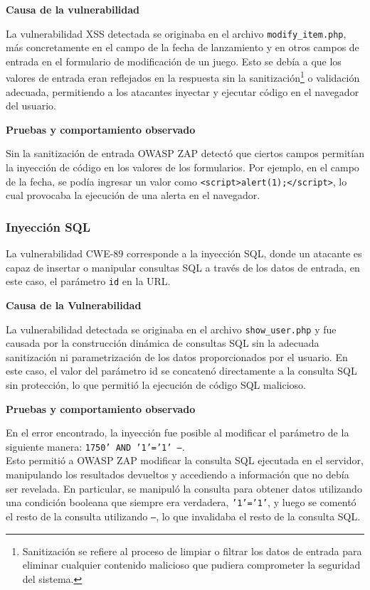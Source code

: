 \documentclass[a4paper,12pt]{article}
\newcommand{\code}[1]{\texttt{#1}}  %
\begin{document}
\textbf{Causa de la vulnerabilidad}

La vulnerabilidad XSS detectada se originaba en el archivo \code{modify\_item.php}, más concretamente en el campo de la fecha de lanzamiento y en otros campos de entrada en el formulario de modificación de un juego. Esto se debía a que los valores de entrada eran reflejados en la respuesta sin la sanitización\footnote{Sanitización se refiere al proceso de limpiar o filtrar los datos de entrada para eliminar cualquier contenido malicioso que pudiera comprometer la seguridad del sistema.\cite{def_sanitization_escaping}} o validación adecuada, permitiendo a los atacantes inyectar y ejecutar código en el navegador del usuario.

\vspace{1em}

\textbf{Pruebas y comportamiento observado}

Sin la sanitización de entrada OWASP ZAP detectó que ciertos campos permitían la inyección de código en los valores de los formularios. Por ejemplo, en el campo de la fecha, se podía ingresar un valor como \code{<script>alert(1);</script>}, lo cual provocaba la ejecución de una alerta en el navegador.

\vspace{1em}

\subsubsection{Inyección SQL}
La vulnerabilidad CWE-89 corresponde a la inyección SQL, donde un atacante es capaz de insertar o manipular consultas SQL a través de los datos de entrada, en este caso, el parámetro \code{id} en la URL. 

\vspace{1em}

\textbf{Causa de la Vulnerabilidad}
 
La vulnerabilidad detectada se originaba en el archivo \code{show\_user.php} y fue causada por la construcción dinámica de consultas SQL sin la adecuada sanitización ni parametrización de los datos proporcionados por el usuario. En este caso, el valor del parámetro id se concatenó directamente a la consulta SQL sin protección, lo que permitió la ejecución de código SQL malicioso.

\vspace{1em}

\textbf{Pruebas y comportamiento observado}

En el error encontrado, la inyección fue posible al modificar el parámetro de la siguiente manera: \code{1750' AND '1'='1' --}.\\
Esto permitió a OWASP ZAP modificar la consulta SQL ejecutada en el servidor, manipulando los resultados devueltos y accediendo a información que no debía ser revelada. En particular, se manipuló la consulta para obtener datos utilizando una condición booleana que siempre era verdadera, \code{'1'='1'}, y luego se comentó el resto de la consulta utilizando \code{--}, lo que invalidaba el resto de la consulta SQL.
\end{document}
